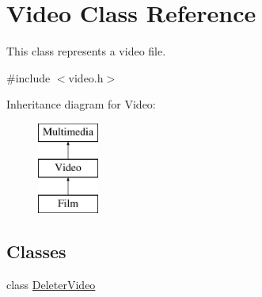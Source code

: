 \hypertarget{class_video}{\section{Video Class Reference}
\label{class_video}
}


This class represents a video file.  




{\ttfamily \#include $<$video.\-h$>$}

Inheritance diagram for Video\-:\begin{figure}[H]
\begin{center}
\leavevmode
\includegraphics[height=3.000000cm]{class_video}
\end{center}
\end{figure}
\subsection*{Classes}
\begin{DoxyCompactItemize}
\item 
class \hyperlink{class_video_1_1_deleter_video}{Deleter\-Video}
\end{DoxyCompactItemize}
